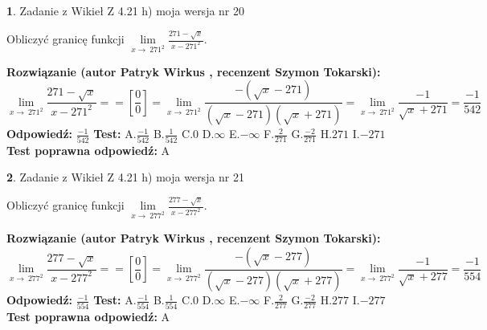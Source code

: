 \documentclass[12pt, a4paper]{article}
\theoremstyle{definition} %
\newtheorem{zad}{}
\newcommand{\zadStart}[1]{\begin{zad}#1\newline}
\newcommand{\zadStop}{\end{zad}}
\newcommand{\rozwStart}[2]{\noindent \textbf{Rozwiązanie (autor #1 , recenzent #2): }\newline}
\newcommand{\rozwStop}{\newline}
\newcommand{\odpStart}{\noindent \textbf{Odpowiedź:}\newline}
\newcommand{\odpStop}{\newline}
\newcommand{\testStart}{\noindent \textbf{Test:}\newline}
\newcommand{\testStop}{\newline}
\newcommand{\kluczStart}{\noindent \textbf{Test poprawna odpowiedź:}\newline}
\newcommand{\kluczStop}{\newline}
\begin{document}
\zadStart{Zadanie z Wikieł Z 4.21 h) moja wersja nr 20}

Obliczyć granicę funkcji $\lim\limits_{x\to\ 271^{2}}\frac{271-\sqrt{x}}{x-271^{2}}$.
\zadStop
\rozwStart{Patryk Wirkus}{Szymon Tokarski}
$$\lim\limits_{x\to\ 271^{2}}\frac{271-\sqrt{x}}{x-271^{2}} = = [\frac{0}{0}] = \lim\limits_{x\to\ 271^{2}}\frac{-(\sqrt{x}-271)}{(\sqrt{x}-271)(\sqrt{x}+271)} = \lim\limits_{x\to\ 271^{2}}\frac{-1}{\sqrt{x}+271} = \frac{-1}{542}$$
\rozwStop
\odpStart
$\frac{-1}{542}$
\odpStop
\testStart
A.$\frac{-1}{542}$ B.$\frac{1}{542}$ C.$0$ D.$\infty$ E.$-\infty$
F.$\frac{2}{271}$ G.$\frac{-2}{271}$
H.$271$
I.$-271$
\testStop
\kluczStart
A
\kluczStop



\zadStart{Zadanie z Wikieł Z 4.21 h) moja wersja nr 21}

Obliczyć granicę funkcji $\lim\limits_{x\to\ 277^{2}}\frac{277-\sqrt{x}}{x-277^{2}}$.
\zadStop
\rozwStart{Patryk Wirkus}{Szymon Tokarski}
$$\lim\limits_{x\to\ 277^{2}}\frac{277-\sqrt{x}}{x-277^{2}} = = [\frac{0}{0}] = \lim\limits_{x\to\ 277^{2}}\frac{-(\sqrt{x}-277)}{(\sqrt{x}-277)(\sqrt{x}+277)} = \lim\limits_{x\to\ 277^{2}}\frac{-1}{\sqrt{x}+277} = \frac{-1}{554}$$
\rozwStop
\odpStart
$\frac{-1}{554}$
\odpStop
\testStart
A.$\frac{-1}{554}$ B.$\frac{1}{554}$ C.$0$ D.$\infty$ E.$-\infty$
F.$\frac{2}{277}$ G.$\frac{-2}{277}$
H.$277$
I.$-277$
\testStop
\kluczStart
A
\kluczStop
\end{document}
